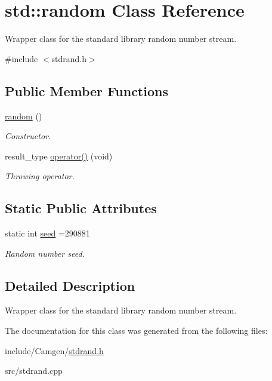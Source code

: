 \hypertarget{a00470}{}\section{std\+:\+:random Class Reference}
\label{a00470}


Wrapper class for the standard library random number stream.  




{\ttfamily \#include $<$stdrand.\+h$>$}

\subsection*{Public Member Functions}
\begin{DoxyCompactItemize}
\item 
\hypertarget{a00470_a13ce6353ffa84582f89d240e2ce532ad}{}\hyperlink{a00470_a13ce6353ffa84582f89d240e2ce532ad}{random} ()\label{a00470_a13ce6353ffa84582f89d240e2ce532ad}

\begin{DoxyCompactList}\small\item\em Constructor. \end{DoxyCompactList}\item 
\hypertarget{a00470_a40a37402e206b13482dd88eb7573f4fc}{}result\+\_\+type \hyperlink{a00470_a40a37402e206b13482dd88eb7573f4fc}{operator()} (void)\label{a00470_a40a37402e206b13482dd88eb7573f4fc}

\begin{DoxyCompactList}\small\item\em Throwing operator. \end{DoxyCompactList}\end{DoxyCompactItemize}
\subsection*{Static Public Attributes}
\begin{DoxyCompactItemize}
\item 
\hypertarget{a00470_a96735d66e9304470438ffd5b0eb13c67}{}static int \hyperlink{a00470_a96735d66e9304470438ffd5b0eb13c67}{seed} =290881\label{a00470_a96735d66e9304470438ffd5b0eb13c67}

\begin{DoxyCompactList}\small\item\em Random number seed. \end{DoxyCompactList}\end{DoxyCompactItemize}


\subsection{Detailed Description}
Wrapper class for the standard library random number stream. 

The documentation for this class was generated from the following files\+:\begin{DoxyCompactItemize}
\item 
include/\+Camgen/\hyperlink{a00791}{stdrand.\+h}\item 
src/stdrand.\+cpp\end{DoxyCompactItemize}
